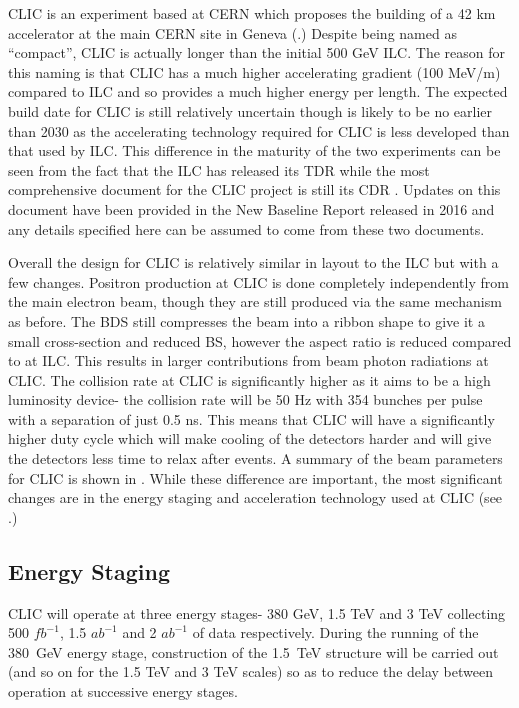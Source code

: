 \ac{CLIC} is an experiment based at CERN which proposes the building of a 42 km accelerator at the main CERN site in Geneva (.) Despite being named as “compact”, \ac{CLIC} is actually longer than the initial 500 GeV \ac{ILC}. The reason for this naming is that \ac{CLIC} has a much higher accelerating gradient (100 MeV/m) compared to ILC and so provides a much higher energy per length. The expected build date for \ac{CLIC} is still relatively uncertain though is likely to be no earlier than 2030 as the accelerating technology required for \ac{CLIC} is less developed than that used by \ac{ILC}. This difference in the maturity of the two experiments can be seen from the fact that the \ac{ILC} has released its \ac{TDR} while the most comprehensive document for the CLIC project is still its \ac{CDR} \cite{CDR}. Updates on this document have been provided in the New Baseline Report \cite{CLIC:2016zwp} released in 2016 and any details specified here can be assumed to come from these two documents. 

Overall the design for \ac{CLIC} is relatively similar in layout to the \ac{ILC} but with a few changes. Positron production at \ac{CLIC} is done completely independently from the main electron beam, though they are still produced via the same mechanism as before. The \ac{BDS} still compresses the beam into a ribbon shape to give it a small cross-section and reduced \ac{BS}, however the aspect ratio is reduced compared to at \ac{ILC}. This results in larger contributions from beam photon radiations at \ac{CLIC}. The collision rate at \ac{CLIC} is significantly higher as it aims to be a high luminosity device- the collision rate will be 50 Hz with 354 bunches per pulse with a separation of just 0.5 ns. This means that CLIC will have a significantly higher duty cycle which will make cooling of the detectors harder and will give the detectors less time to relax after events. A summary of the beam parameters for CLIC is shown in . While these difference are important, the most significant changes are in the energy staging and acceleration technology used at \ac{CLIC} (see .)

\subsection{Energy Staging}

CLIC will operate at three energy stages- 380 GeV, 1.5 TeV and 3 TeV collecting 500 ${fb^{-1}}$, 1.5 ${ab^{-1}}$ and 2 ${ab^{-1}}$ of data respectively. During the running of the 380~GeV energy stage, construction of the 1.5~TeV structure will be carried out (and so on for the 1.5 TeV and 3 TeV scales) so as to reduce the delay between operation at successive energy stages. 

